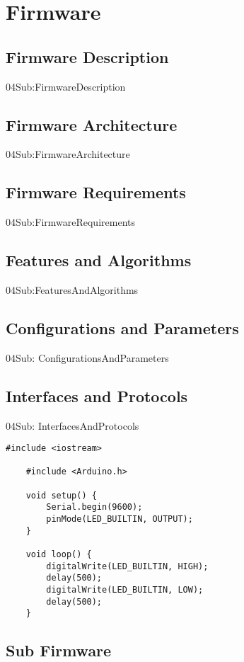\newpage

\section{Firmware}\label{04Sec:Firmware}


\subsection{Firmware Description}{04Sub:FirmwareDescription}


\subsection{Firmware Architecture}{04Sub:FirmwareArchitecture}

\subsection{Firmware Requirements}{04Sub:FirmwareRequirements}

\subsection{Features and Algorithms}{04Sub:FeaturesAndAlgorithms}

\subsection{ Configurations and Parameters}{04Sub: ConfigurationsAndParameters}

\subsection{Interfaces and Protocols}{04Sub: InterfacesAndProtocols}




\begin{lstlisting}[language=Arduino]
    #include <iostream>

    #include <Arduino.h>

    void setup() {
        Serial.begin(9600);
        pinMode(LED_BUILTIN, OUTPUT);
    }
    
    void loop() {
        digitalWrite(LED_BUILTIN, HIGH);
        delay(500);
        digitalWrite(LED_BUILTIN, LOW);
        delay(500);
    }
    \end{lstlisting}


\subsection{Sub Firmware}\label{04Sub:}




